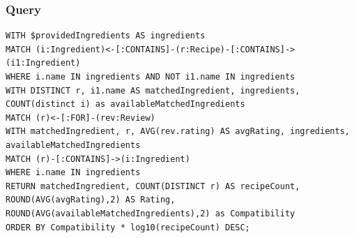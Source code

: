 \begin{enumerate}
\subsubsection{Query}

\begin{verbatim}
WITH $providedIngredients AS ingredients
MATCH (i:Ingredient)<-[:CONTAINS]-(r:Recipe)-[:CONTAINS]->(i1:Ingredient)
WHERE i.name IN ingredients AND NOT i1.name IN ingredients
WITH DISTINCT r, i1.name AS matchedIngredient, ingredients, COUNT(distinct i) as availableMatchedIngredients
MATCH (r)<-[:FOR]-(rev:Review)
WITH matchedIngredient, r, AVG(rev.rating) AS avgRating, ingredients, availableMatchedIngredients
MATCH (r)-[:CONTAINS]->(i:Ingredient)
WHERE i.name IN ingredients
RETURN matchedIngredient, COUNT(DISTINCT r) AS recipeCount, ROUND(AVG(avgRating),2) AS Rating, ROUND(AVG(availableMatchedIngredients),2) as Compatibility
ORDER BY Compatibility * log10(recipeCount) DESC;
\end{verbatim}

        

\end{enumerate}
